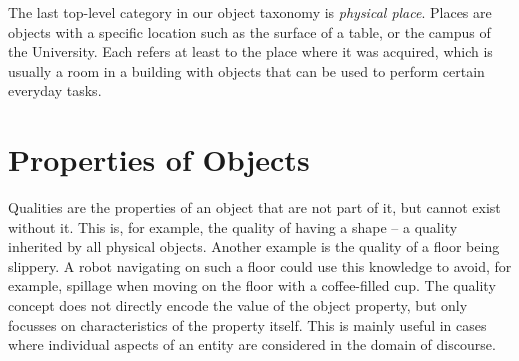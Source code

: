 The last top-level category in our object taxonomy is \emph{physical place}.
Places are objects with a specific location such as the surface of a table, or the campus of the University.
Each \neem refers at least to the place where it was acquired, which is usually a room in a building with objects that can be used to perform certain everyday tasks.
%



\section{Properties of Objects}
\label{sec:background:properties}

Qualities are the properties of an object that are not part of it, but cannot exist without it.
This is, for example, the quality of having a shape -- a quality inherited by all physical objects.
Another example is the quality of a floor being slippery.
A robot navigating on such a floor could use this knowledge to avoid, for example,
spillage when moving on the floor with a coffee-filled cup.
The quality concept does not directly encode the value of the object property, but only focusses on characteristics of the property itself.
This is mainly useful in cases where individual aspects of an entity are considered in the domain of discourse.

